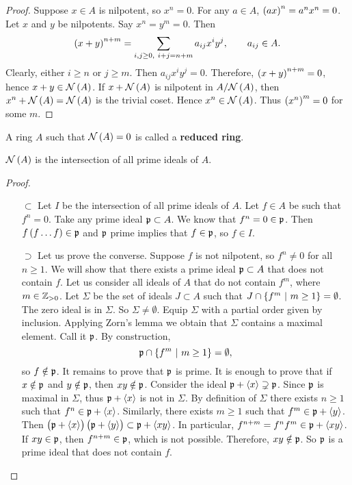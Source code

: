\begin{proof}
Suppose $ x \in A $ is nilpotent, so $ x^n = 0 $. For any $ a \in A $, $ \br{ax}^n = a^nx^n = 0 $. Let $ x $ and $ y $ be nilpotents. Say $ x^n = y^m = 0 $. Then
$$ \br{x + y}^{n + m} = \sum_{i, j \ge 0, \ i + j = n + m} a_{ij}x^iy^j, \qquad a_{ij} \in A. $$
Clearly, either $ i \ge n $ or $ j \ge m $. Then $ a_{ij}x^iy^j = 0 $. Therefore, $ \br{x + y}^{n + m} = 0 $, hence $ x + y \in \NNN\br{A} $. If $ x + \NNN\br{A} $ is nilpotent in $ A / \NNN\br{A} $, then $ x^n + \NNN\br{A} = \NNN\br{A} $ is the trivial coset. Hence $ x^n \in \NNN\br{A} $. Thus $ \br{x^n}^m = 0 $ for some $ m $.
\end{proof}

A ring $ A $ such that $ \NNN\br{A} = 0 $ is called a \textbf{reduced ring}.

\begin{proposition}
\label{prop:5.3}
$ \NNN\br{A} $ is the intersection of all prime ideals of $ A $.
\end{proposition}

\begin{proof}
\hfill
\begin{itemize}
\item[$ \subset $] Let $ I $ be the intersection of all prime ideals of $ A $. Let $ f \in A $ be such that $ f^n = 0 $. Take any prime ideal $ \mathfrak{p} \subset A $. We know that $ f^n = 0 \in \mathfrak{p} $. Then $ f\br{f \dots f} \in \ppp $ and $ \mathfrak{p} $ prime implies that $ f \in \mathfrak{p} $, so $ f \in I $.
\item[$ \supset $] Let us prove the converse. Suppose $ f $ is not nilpotent, so $ f^n \ne 0 $ for all $ n \ge 1 $. We will show that there exists a prime ideal $ \mathfrak{p} \subset A $ that does not contain $ f $. Let us consider all ideals of $ A $ that do not contain $ f^m $, where $ m \in \mathbb{Z}_{> 0} $. Let $ \Sigma $ be the set of ideals $ J \subset A $ such that $ J \cap \cbr{f^m \st m \ge 1} = \emptyset $. The zero ideal is in $ \Sigma $. So $ \Sigma \ne \emptyset $. Equip $ \Sigma $ with a partial order given by inclusion. Applying Zorn's lemma we obtain that $ \Sigma $ contains a maximal element. Call it $ \mathfrak{p} $. By construction,
$$ \ppp \cap \cbr{f^m \st m \ge 1} = \emptyset, $$
so $ f \notin \mathfrak{p} $. It remains to prove that $ \mathfrak{p} $ is prime. It is enough to prove that if $ x \notin \mathfrak{p} $ and $ y \notin \mathfrak{p} $, then $ xy \notin \mathfrak{p} $. Consider the ideal $ \mathfrak{p} + \left\langle x \right\rangle \supsetneq \mathfrak{p} $. Since $ \mathfrak{p} $ is maximal in $ \Sigma $, thus $ \mathfrak{p} + \left\langle x \right\rangle $ is not in $ \Sigma $. By definition of $ \Sigma $ there exists $ n \ge 1 $ such that $ f^n \in \mathfrak{p} + \left\langle x \right\rangle $. Similarly, there exists $ m \ge 1 $ such that $ f^m \in \mathfrak{p} + \left\langle y \right\rangle $. Then $ \br{\ppp + \abr{x}}\br{\ppp + \abr{y}} \subset \ppp + \abr{xy} $. In particular, $ f^{n + m} = f^nf^m \in \mathfrak{p} + \left\langle xy \right\rangle $. If $ xy \in \mathfrak{p} $, then $ f^{n + m} \in \mathfrak{p} $, which is not possible. Therefore, $ xy \notin \mathfrak{p} $. So $ \mathfrak{p} $ is a prime ideal that does not contain $ f $.
\end{itemize}
\end{proof}

